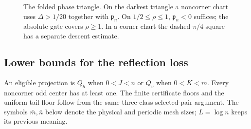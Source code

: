 \begin{figure}[ht]
\centering
{}
\caption{The folded phase triangle. On the darkest triangle a
noncorner chart uses $\Delta>1/20$ together with $\mathfrak p_n$.
On $1/2\leq\rho\leq1$, $\mathfrak p_n<0$ suffices; the absolute gate covers
$\rho\geq1$. In a corner chart the dashed $\pi/4$ square has a
separate descent estimate.}
\label{fig:phase-regions}
\end{figure}



\subsection{Lower bounds for the reflection loss}

An eligible projection is $Q_h$ when $0<J<n$ or $Q_v$ when $0<K<m$.
Every noncorner odd center has at least one. The finite certificate
floors and the uniform tail floor follow from the same three-class
selected-pair argument. The symbols $\bar m,\bar n$ below denote
the physical and periodic mesh sizes; $L=\log n$ keeps its previous meaning.

